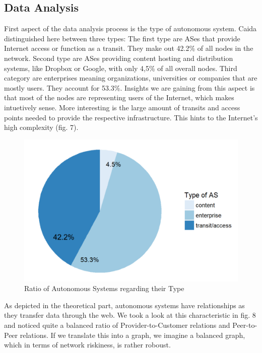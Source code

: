 \documentclass[conference, 11pt]{IEEEtran}
\begin{document}
\subsection{Data Analysis}
First aspect of the data analysis process is the type of autonomous system. Caida distinguished here between three types: The first type are ASes that provide Internet access or function as a transit. They make out 42.2\% of all nodes in the network. Second type are ASes providing content hosting and distribution systems, like Dropbox or Google, with only 4,5\% of all overall nodes. Third category are enterprises meaning organizations, universities or companies that are mostly users. They account for 53.3\%. Insights we are gaining from this aspect is that most of the nodes are representing users of the Internet, which makes intuetively sense. More interesting is the large amount of transits and access points needed to provide the respective infrastructure. This hints to the Internet's high complexity (fig. 7).

\vspace{0.5cm}
\begin{figure}[htbp]
\centerline{\includegraphics[scale=0.4]{Graphics/typeofAS.PNG}}
\caption{Ratio of Autonomous Systems regarding their Type }
\label{fig}
\end{figure}
\vspace{0.5cm}

As depicted in the theoretical part, autonomous systems have relationships as they transfer data through the web. We took a look at this characteristic in fig. 8 and noticed quite a balanced ratio of Provider-to-Customer relations and Peer-to-Peer relations. If we translate this into a graph, we imagine a balanced graph, which in terms of network riskiness, is rather roboust. 
\end{document}

